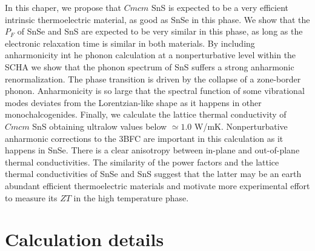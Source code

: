 In this chaper, we propose that $Cmcm$ SnS is expected to be a very efficient intrinsic thermoelectric material, as good as SnSe in this phase. We show that the $P_{F}$ of SnSe and SnS are expected to be very similar in this 
phase, as long as the electronic relaxation time is similar in both materials. By including anharmonicity int he phonon calculation at a nonperturbative level within the SCHA we show that the phonon spectrum of SnS suffers 
a strong anharmonic renormalization. The phase transition is driven by the collapse of a zone-border phonon. Anharmonicity is so large that the spectral function of some vibrational modes deviates from the Lorentzian-like 
shape as it happens in other monochalcogenides\cite{ribeiro2018strong,li2014phonon}. Finally, we calculate the lattice thermal conductivity of $Cmcm$ SnS obtaining ultralow values below $\simeq 1.0$ W/mK. Nonperturbative 
anharmonic corrections to the 3BFC are important in this calculation as it happens in SnSe\cite{aseginolaza2019phonon}. There is a clear anisotropy between in-plane and out-of-plane thermal conductivities. The similarity
of the power factors and the lattice thermal conductivities of SnSe and SnS suggest that the latter may be an earth abundant efficient thermoelectric materials and motivate more experimental effort to measure its $ZT$ 
in the high temperature phase.

\section{Calculation details} 

